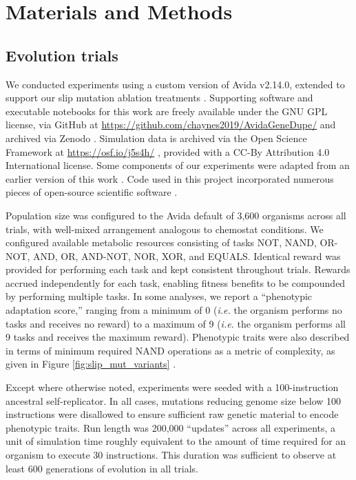 \section{Materials and Methods} \label{sec:methods}

\subsection{Evolution trials}

We conducted experiments using a custom version of Avida v2.14.0, extended to support our slip mutation ablation treatments \citep{Ofria:2009avida}.
Supporting software and executable notebooks for this work are freely available under the GNU GPL license, via GitHub at \url{https://github.com/chaynes2019/AvidaGeneDupe/} and archived via Zenodo \citep{haynes_2025,https://doi.org/10.25495/7gxk-rd71}.
Simulation data is archived via the Open Science Framework at \url{https://osf.io/j5s4h/} \citep{Moreno_Haynes_2025,foster2017open}, provided with a CC-By Attribution 4.0 International license.
Some components of our experiments were adapted from an earlier version of this work \citep{lalejini2017gene}.
Code used in this project incorporated numerous pieces of open-source scientific software \citep{2020SciPy-NMeth,harris2020array,reback2020pandas,mckinney-proc-scipy-2010,waskom2021seaborn,hunter2007matplotlib,moreno2023teeplot,r_core_team_r:_2015}.

Population size was configured to the Avida default of 3,600 organisms across all trials, with well-mixed arrangement analogous to chemostat conditions.
We configured available metabolic resources consisting of tasks NOT, NAND, OR-NOT, AND, OR, AND-NOT, NOR, XOR, and EQUALS.
Identical reward was provided for performing each task and kept consistent throughout trials.
Rewards accrued independently for each task, enabling fitness benefits to be compounded by performing multiple tasks.
In some analyses, we report a ``phenotypic adaptation score,'' ranging from a minimum of 0 (\textit{i.e.} the organism performs no tasks and receives no reward) to a maximum of 9 (\textit{i.e.} the organism performs all 9 tasks and receives the maximum reward).
Phenotypic traits were also described in terms of minimum required NAND operations as a metric of complexity, as given in Figure \ref{fig:slip_mut_variants} \citep{lenski2003evolutionary}.

Except where otherwise noted, experiments were seeded with a 100-instruction ancestral self-replicator.
In all cases, mutations reducing genome size below 100 instructions were disallowed to ensure sufficient raw genetic material to encode phenotypic traits.
Run length was 200,000 ``updates'' across all experiments, a unit of simulation time roughly equivalent to the amount of time required for an organism to execute 30 instructions.
This duration was sufficient to observe at least 600 generations of evolution in all trials.

